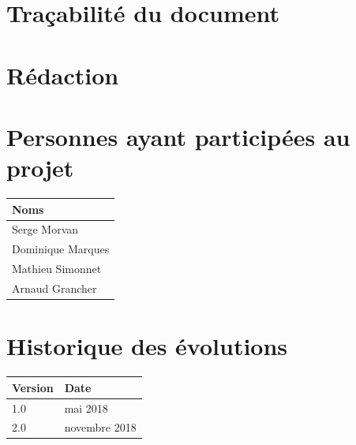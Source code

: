 \hbox{}
\newpage

\section*{Tra\c cabilit\'e du document}
\section*{R\'edaction}


\section*{Personnes ayant particip\'ees au projet}

\begin{tabular}{|l|} \hline
Noms \\
\hline
Serge Morvan \\
Dominique Marques \\
Mathieu Simonnet \\
Arnaud Grancher \\
\hline
\end{tabular}



\section*{Historique des \'evolutions}

\begin{tabular}{|l|l|} \hline
Version         & Date        \\ 
\hline 
   1.0         &   mai 2018  \\
   \hline 
   2.0         &   novembre 2018   \\
\hline
\end{tabular}

\newpage
\hbox{}
\newpage


\tableofcontents

\hbox{}
\newpage

\listoffigures

\newpage
\hbox{}
\newpage